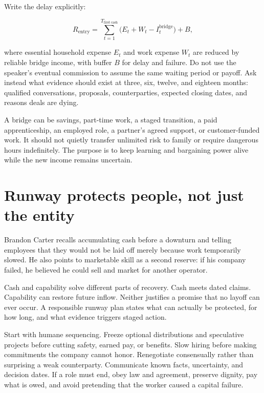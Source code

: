 Write the delay explicitly:

\begin{equation}
R_{\mathrm{entry}}
  =\sum_{t=1}^{T_{\mathrm{first\ cash}}}
     \bigl(E_t+W_t-I^{\mathrm{bridge}}_t\bigr)
     +B,
\end{equation}

where essential household expense \(E_t\) and work expense \(W_t\) are reduced
by reliable bridge income, with buffer \(B\) for delay and failure. Do not use
the speaker's eventual commission to assume the same waiting period or payoff.
Ask instead what evidence should exist at three, six, twelve, and eighteen
months: qualified conversations, proposals, counterparties, expected closing
dates, and reasons deals are dying.

A bridge can be savings, part-time work, a staged transition, a paid
apprenticeship, an employed role, a partner's agreed support, or customer-funded
work. It should not quietly transfer unlimited risk to family or require
dangerous hours indefinitely. The purpose is to keep learning and bargaining
power alive while the new income remains uncertain.

\section{Runway protects people, not just the entity}

Brandon Carter recalls accumulating cash before a downturn and telling
employees that they would not be laid off merely because work temporarily
slowed. He also points to marketable skill as a second reserve: if his company
failed, he believed he could sell and market for another operator.

Cash and capability solve different parts of recovery. Cash meets dated claims.
Capability can restore future inflow. Neither justifies a promise that no
layoff can ever occur. A responsible runway plan states what can actually be
protected, for how long, and what evidence triggers staged action.

Start with humane sequencing. Freeze optional distributions and speculative
projects before cutting safety, earned pay, or benefits. Slow hiring before
making commitments the company cannot honor. Renegotiate consensually rather
than surprising a weak counterparty. Communicate known facts, uncertainty, and
decision dates. If a role must end, obey law and agreement, preserve dignity,
pay what is owed, and avoid pretending that the worker caused a capital
failure.

